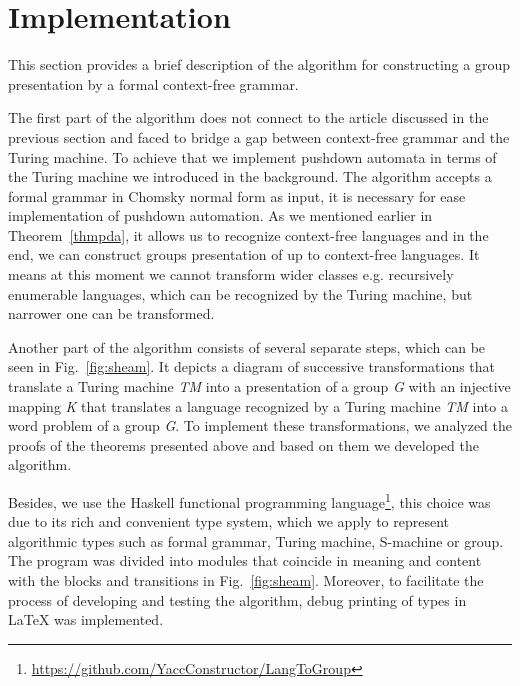 \documentclass[conference]{IEEEtran}
\theoremstyle{definition}
\begin{document}
\section{Implementation}

This section provides a brief description of the algorithm for constructing
a group presentation by a formal context-free grammar.

The first part of the algorithm does not connect to the article discussed in the previous section and faced to bridge a gap between context-free grammar and the Turing machine.
To achieve that we implement pushdown automata in terms of the Turing machine we introduced
in the background. The algorithm accepts a formal grammar in Chomsky normal form as input,
it is necessary for ease implementation of pushdown automation.
As we mentioned earlier in Theorem~\ref{thmpda}, it allows
us to recognize context-free languages and in the end,
we can construct groups presentation of
up to context-free languages. It means at this moment we cannot transform wider
classes e.g. recursively enumerable languages, which can be recognized
by the Turing machine, but narrower one can be transformed.

Another part of the algorithm consists of several separate steps,
which can be seen in Fig.~\ref{fig:sheam}.
It depicts a diagram of successive transformations that translate
a Turing machine \textit{TM} into a presentation of a group \textit{G}
with an injective mapping \textit{K} that translates a language recognized by
a Turing machine \textit{TM} into a word problem of a group \textit{G}.
To implement these transformations, we analyzed the proofs
of the theorems presented above and based on them we developed the algorithm.

Besides, we use the Haskell functional programming
language\footnote{\url{https://github.com/YaccConstructor/LangToGroup}},
this choice was due to its rich and convenient type system,
which we apply to represent algorithmic types such as formal grammar,
Turing machine, S-machine or group. The program was divided into modules
that coincide in meaning and content with the blocks and transitions
in Fig.~\ref{fig:sheam}. Moreover, to facilitate the process of developing
and testing the algorithm, debug printing of types in LaTeX was implemented.
\end{document}
